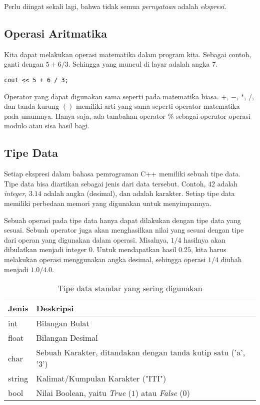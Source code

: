 \documentclass[../main.tex]{subfiles}
\begin{document}
Perlu diingat sekali lagi, bahwa tidak semua \emph{pernyataan} adalah
\emph{ekspresi}.

\subsection{Operasi Aritmatika}
Kita dapat melakukan operasi matematika dalam program kita. Sebagai contoh,
ganti  dengan \(5 + 6 / 3\). Sehingga yang
muncul di layar adalah angka \(7\).

\begin{verbatim}
cout << 5 + 6 / 3;
\end{verbatim}

Operator yang dapat digunakan sama seperti pada matematika biasa. \(+\), \(-\),
\(*\), \(/\), dan tanda kurung \(()\) memiliki arti yang sama seperti operator matematika
pada umumnya. Hanya saja, ada tambahan operator \(\%\) sebagai operator operasi
modulo atau sisa hasil bagi.

\subsection{Tipe Data}
Setiap ekspresi dalam bahasa pemrograman C++ memiliki sebuah tipe data. Tipe
data bisa diartikan sebagai jenis dari data tersebut. Contoh, \(42\) adalah
\emph{integer}, \(3.14\) adalah angka  (desimal), dan
 adalah karakter. Setiap tipe data memiliki perbedaan memori yang
digunakan untuk menyimpannya.

Sebuah operasi pada tipe data hanya dapat dilakukan dengan tipe data yang sesuai.
Sebuah operator juga akan menghasilkan nilai yang sesuai dengan tipe dari operan
yang digunakan dalam operasi. Misalnya, \(1/4\) hasilnya akan dibulatkan menjadi
integer \(0\). Untuk mendapatkan hasil \(0.25\), kita harus melakukan operasi
menggunakan angka desimal, sehingga operasi \(1/4\) diubah menjadi \(1.0/4.0\).

\begin{table}
\centering
\begin{tabular}{@{} l l @{}}
  \toprule
  Jenis  & Deskripsi  \\
  \midrule
  int    & Bilangan Bulat\\
  float  & Bilangan Desimal\\
  char   & Sebuah Karakter, ditandakan dengan tanda kutip satu ('a', '3')\\
  string & Kalimat/Kumpulan Karakter ("ITI")\\
  bool   & Nilai Boolean, yaitu \emph{True} (\(1\)) atau \emph{False} (\(0\))\\
  \bottomrule
\end{tabular}
\caption{Tipe data standar yang sering digunakan}
\label{tipe-var}
\end{table}
\end{document}
